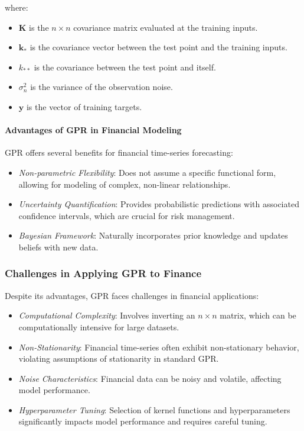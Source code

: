 where:

\begin{itemize}
    \item $\mathbf{K}$ is the $n \times n$ covariance matrix evaluated at the training inputs.
    \item $\mathbf{k}_*$ is the covariance vector between the test point and the training inputs.
    \item $k_{**}$ is the covariance between the test point and itself.
    \item $\sigma_n^2$ is the variance of the observation noise.
    \item $\mathbf{y}$ is the vector of training targets.
\end{itemize}

\paragraph{Advantages of GPR in Financial Modeling}

GPR offers several benefits for financial time-series forecasting:

\begin{itemize}
    \item \textit{Non-parametric Flexibility}: Does not assume a specific functional form, allowing for modeling of complex, non-linear relationships.
    \item \textit{Uncertainty Quantification}: Provides probabilistic predictions with associated confidence intervals, which are crucial for risk management.
    \item \textit{Bayesian Framework}: Naturally incorporates prior knowledge and updates beliefs with new data.
\end{itemize}

\subsubsection{Challenges in Applying GPR to Finance}

Despite its advantages, GPR faces challenges in financial applications:

\begin{itemize}
    \item \textit{Computational Complexity}: Involves inverting an $n \times n$ matrix, which can be computationally intensive for large datasets.
    \item \textit{Non-Stationarity}: Financial time-series often exhibit non-stationary behavior, violating assumptions of stationarity in standard GPR.
    \item \textit{Noise Characteristics}: Financial data can be noisy and volatile, affecting model performance.
    \item \textit{Hyperparameter Tuning}: Selection of kernel functions and hyperparameters significantly impacts model performance and requires careful tuning.
\end{itemize}


